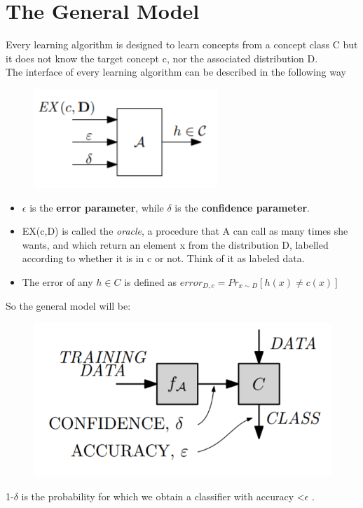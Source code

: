 \section{The General Model}
Every learning algorithm is designed to learn concepts from a concept class C but it does not know the target concept c, nor the associated distribution D.\\
The interface of every learning algorithm can be described in the following way
\begin{figure}[H]
	\centerline{\includegraphics[scale=1]{figures/old/learning}}
\end{figure}
\begin{itemize}
	\item \(\epsilon\) is the \textbf{error parameter}, while \(\delta\) is the \textbf{confidence parameter}.
	\item EX(c,D) is called the \textit{oracle}, a procedure that A can call as many times she wants, and which return an element x from the distribution D, labelled according to whether it is in c or not. Think of it as labeled data.
	\item The error of any \(h \in C\) is defined as \(error_{D,c} = Pr_{x\sim D}[h(x) \ne c(x)]\)
\end{itemize}
So the general model will be:
\begin{figure}[H]
	\centerline{\includegraphics[scale=0.5]{figures/old/learning1}}
\end{figure}
1-\(\delta\) is the probability for which we obtain a classifier with accuracy <\(\epsilon\) .\\
